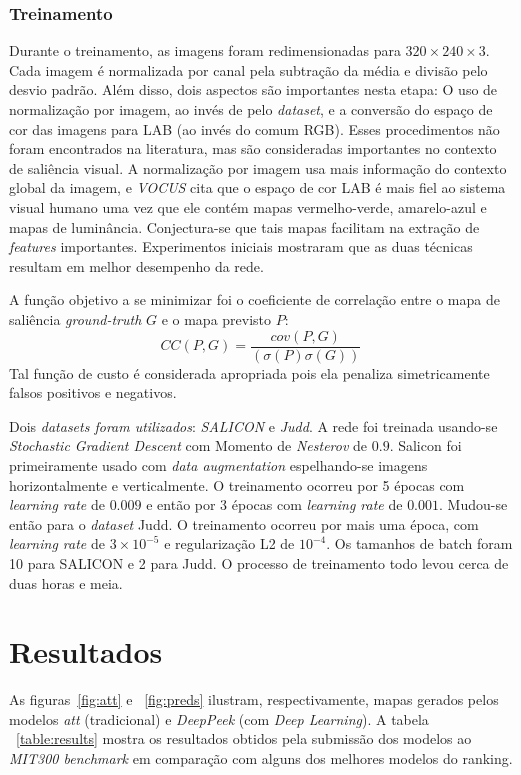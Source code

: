 \documentclass[11pt]{article}
\newcommand{\tit}[1]{\textit{#1}}
\begin{document}
\subsubsection{Treinamento}
Durante o treinamento, as imagens foram redimensionadas para
$320\times240\times3$.
Cada imagem é normalizada por canal pela subtração da média e
divisão pelo desvio padrão.
Além disso, dois aspectos são importantes nesta etapa:
O uso de normalização por imagem, ao invés de pelo \tit{dataset}, e a
conversão do espaço de cor das imagens para LAB (ao invés do comum RGB).
Esses procedimentos não foram encontrados na literatura, mas são consideradas
importantes no contexto de saliência visual.
A normalização por imagem usa mais informação do contexto global da imagem, e
\emph{VOCUS} cita que o espaço de cor LAB é mais fiel ao sistema visual humano
uma vez que ele contém mapas vermelho-verde, amarelo-azul e mapas de
luminância.
Conjectura-se que tais mapas facilitam na extração de \tit{features}
importantes.
Experimentos iniciais mostraram que as duas técnicas resultam em melhor
desempenho da rede.

A função objetivo a se minimizar foi
o coeficiente de correlação entre o mapa de saliência \tit{ground-truth} $G$
e o mapa previsto $P$:
$$CC(P, G) = \frac{cov(P, G)}{(\sigma(P)\sigma(G))}$$
Tal função de custo é considerada apropriada pois ela penaliza simetricamente
falsos positivos e negativos.

Dois \tit{datasets foram utilizados}:
\emph{SALICON} e \emph{Judd}.
A rede foi treinada usando-se \tit{Stochastic Gradient Descent}
com Momento de \tit{Nesterov} de $0.9$.
Salicon foi primeiramente usado com \tit{data augmentation} espelhando-se
imagens horizontalmente e verticalmente.
O treinamento ocorreu por 5 épocas com \tit{learning rate} de $0.009$
e então por 3 épocas com \tit{learning rate} de $0.001$.
Mudou-se então para o \tit{dataset} Judd.
O treinamento ocorreu por mais uma época, com \tit{learning rate} de
$3\times10^{-5}$ e regularização L2 de $10^{-4}$.
Os tamanhos de batch foram 10 para SALICON e 2 para Judd.
O processo de treinamento todo levou cerca de duas horas e meia.

\section{Resultados}
As figuras~\ref{fig:att} e ~\ref{fig:preds} ilustram, respectivamente,
mapas gerados pelos modelos \tit{att} (tradicional) e \tit{DeepPeek}
(com \tit{Deep Learning}).
A tabela ~\ref{table:results} mostra os resultados obtidos pela submissão
dos modelos ao \tit{MIT300 benchmark} em comparação com alguns dos melhores
modelos do ranking.
\end{document}
